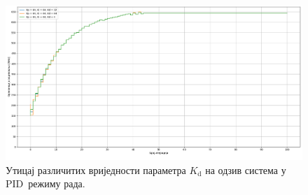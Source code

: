 \documentclass[master]{finthesis}
\def \PID  {PID} %
\begin{document}
% 
\begin{figure}[!ht]
	 \centering
	 \includegraphics[scale=0.2]{slike/pid_kd_tuning.png}
    	 \caption{Утицај различитих вриједности параметра $K_\text{d}$ на одзив система у \PID\ режиму рада.}
    	 \label{pid_kd_tuning}
\end{figure}
\end{document}
